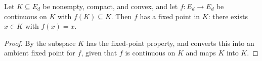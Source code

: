 \begin{theorem}
    \label{thm:brouwer}
    Let $K \subseteq E_d$ be nonempty, compact, and convex, and let
    $f : E_d \to E_d$ be continuous on $K$ with $f(K) \subseteq K$. Then $f$ has
    a fixed point in $K$: there exists $x \in K$ with $f(x) = x$.
\end{theorem}
\begin{proof}
    By  the subspace $K$ has the fixed-point property, and
     converts this into an ambient fixed point for $f$,
    given that $f$ is continuous on $K$ and maps $K$ into $K$.
\end{proof}


